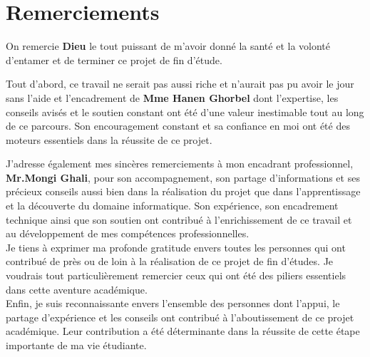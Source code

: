 \newpage
\section*{Remerciements}

On remercie \textbf{Dieu} le tout puissant de m'avoir donné la santé et la volonté d'entamer et de terminer ce projet de fin d'étude.

Tout d'abord, ce travail ne serait pas aussi riche et n'aurait pas pu avoir le jour sans l'aide et l'encadrement de \textbf{Mme Hanen Ghorbel} dont l'expertise, les conseils avisés et le soutien constant ont été d'une valeur inestimable tout au long de ce parcours. Son encouragement constant et sa confiance en moi ont été des moteurs essentiels dans la réussite de ce projet.\

J’adresse également mes sincères remerciements à mon encadrant professionnel, \textbf{Mr.Mongi Ghali}, pour son accompagnement, son partage d’informations et ses précieux conseils aussi bien dans la réalisation du projet que dans l’apprentissage et la découverte du domaine informatique. Son expérience, son encadrement technique ainsi que son soutien ont contribué à l’enrichissement de ce travail et au développement de mes compétences professionnelles.\\

Je tiens à exprimer ma profonde gratitude envers toutes les personnes qui ont contribué de près ou de loin à la réalisation de ce projet de fin d'études. Je voudrais tout particulièrement remercier ceux qui ont été des piliers essentiels dans cette aventure académique.\\

Enfin, je suis reconnaissante envers l'ensemble des personnes dont l'appui, le partage d'expérience et les conseils ont contribué à l'aboutissement de ce projet académique. Leur contribution a été déterminante dans la réussite de cette étape importante de ma vie étudiante.